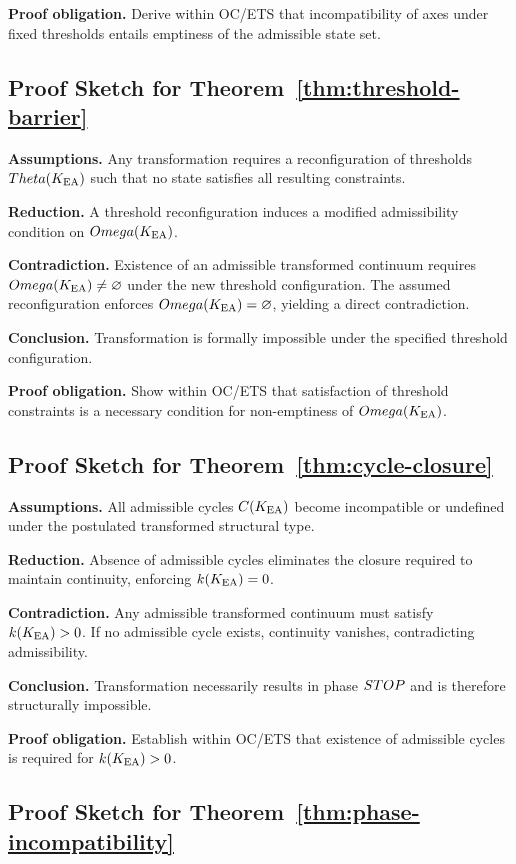 \textbf{Proof obligation.}
Derive within OC/ETS that incompatibility of axes under fixed thresholds
entails emptiness of the admissible state set.

\subsection*{Proof Sketch for Theorem~\ref{thm:threshold-barrier}}

\textbf{Assumptions.}
Any transformation requires a reconfiguration of thresholds $Theta(K_{\mathrm{EA}})$
such that no state satisfies all resulting constraints.

\textbf{Reduction.}
A threshold reconfiguration induces a modified admissibility condition on
$Omega(K_{\mathrm{EA}})$.

\textbf{Contradiction.}
Existence of an admissible transformed continuum requires
$Omega(K_{\mathrm{EA}})\neq\varnothing$ under the new threshold configuration. The
assumed reconfiguration enforces $Omega(K_{\mathrm{EA}})=\varnothing$, yielding a
direct contradiction.

\textbf{Conclusion.}
Transformation is formally impossible under the specified threshold
configuration.

\textbf{Proof obligation.}
Show within OC/ETS that satisfaction of threshold constraints is a
necessary condition for non-emptiness of $Omega(K_{\mathrm{EA}})$.

\subsection*{Proof Sketch for Theorem~\ref{thm:cycle-closure}}

\textbf{Assumptions.}
All admissible cycles $C(K_{\mathrm{EA}})$ become incompatible or undefined under
the postulated transformed structural type.

\textbf{Reduction.}
Absence of admissible cycles eliminates the closure required to maintain
continuity, enforcing $k(K_{\mathrm{EA}})=0$.

\textbf{Contradiction.}
Any admissible transformed continuum must satisfy $k(K_{\mathrm{EA}})>0$.
If no admissible cycle exists, continuity vanishes, contradicting
admissibility.

\textbf{Conclusion.}
Transformation necessarily results in phase $STOP$ and is therefore
structurally impossible.

\textbf{Proof obligation.}
Establish within OC/ETS that existence of admissible cycles is required for
$k(K_{\mathrm{EA}})>0$.

\subsection*{Proof Sketch for Theorem~\ref{thm:phase-incompatibility}}


